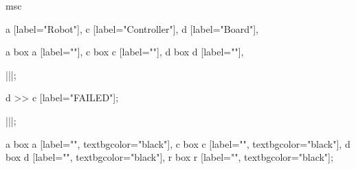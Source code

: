 \begin{msc}
msc
{

a [label="Robot"],
c [label="Controller"],
d [label="Board"],

a box a [label=""],
c box c [label=""],
d box d [label=""],

|||;

d >> c [label="FAILED"];

|||;

a box a [label="", textbgcolor="black"],
c box c [label="", textbgcolor="black"],
d box d [label="", textbgcolor="black"],
r box r [label="", textbgcolor="black"];

}
\end{msc}
